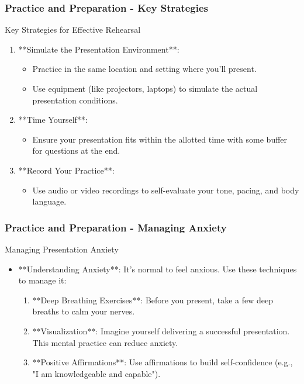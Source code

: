 \documentclass[aspectratio=169]{beamer}
\begin{document}
\begin{frame}[fragile]
    \frametitle{Practice and Preparation - Key Strategies}
    \begin{block}{Key Strategies for Effective Rehearsal}
        \begin{enumerate}
            \item **Simulate the Presentation Environment**:
            \begin{itemize}
                \item Practice in the same location and setting where you'll present.
                \item Use equipment (like projectors, laptops) to simulate the actual presentation conditions.
            \end{itemize}

            \item **Time Yourself**:
            \begin{itemize}
                \item Ensure your presentation fits within the allotted time with some buffer for questions at the end.
            \end{itemize}

            \item **Record Your Practice**:
            \begin{itemize}
                \item Use audio or video recordings to self-evaluate your tone, pacing, and body language.
            \end{itemize}
        \end{enumerate}
    \end{block}
\end{frame}

\begin{frame}[fragile]
    \frametitle{Practice and Preparation - Managing Anxiety}
    \begin{block}{Managing Presentation Anxiety}
        \begin{itemize}
            \item **Understanding Anxiety**: It's normal to feel anxious. Use these techniques to manage it:
            \begin{enumerate}
                \item **Deep Breathing Exercises**: Before you present, take a few deep breaths to calm your nerves.
                \item **Visualization**: Imagine yourself delivering a successful presentation. This mental practice can reduce anxiety.
                \item **Positive Affirmations**: Use affirmations to build self-confidence (e.g., "I am knowledgeable and capable").
            \end{enumerate}
        \end{itemize}
    \end{block}
\end{frame}
\end{document}

